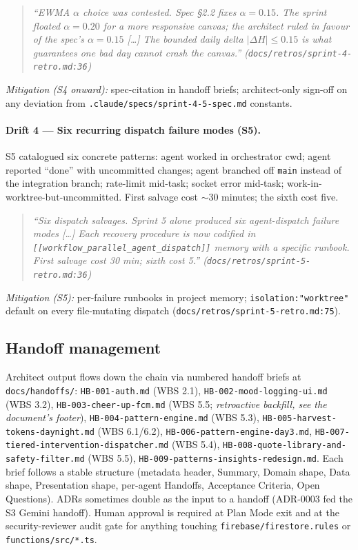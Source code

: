 \documentclass[11pt,a4paper]{article}
\begin{document}
\begin{quote}\itshape
``EWMA $\alpha$ choice was contested. Spec \S 2.2 fixes $\alpha=0.15$.
The sprint floated $\alpha=0.20$ for a more responsive canvas; the
architect ruled in favour of the spec's $\alpha=0.15$ [\ldots] The
bounded daily delta $|\Delta H| \le 0.15$ is what guarantees one bad
day cannot crash the canvas.''
(\texttt{docs/retros/sprint-4-retro.md:36})
\end{quote}

\textit{Mitigation (S4 onward):} spec-citation in handoff briefs;
architect-only sign-off on any deviation from
\texttt{.claude/specs/sprint-4-5-spec.md} constants.

\paragraph{Drift 4 --- Six recurring dispatch failure modes (S5).} S5
catalogued six concrete patterns: agent worked in orchestrator cwd;
agent reported ``done'' with uncommitted changes; agent branched off
\texttt{main} instead of the integration branch; rate-limit mid-task;
socket error mid-task; work-in-worktree-but-uncommitted. First salvage
cost $\sim$30 minutes; the sixth cost five.

\begin{quote}\itshape
``Six dispatch salvages. Sprint 5 alone produced six agent-dispatch
failure modes [\ldots] Each recovery procedure is now codified in
\texttt{[[workflow\_parallel\_agent\_dispatch]]} memory with a specific
runbook. First salvage cost 30 min; sixth cost 5.''
(\texttt{docs/retros/sprint-5-retro.md:36})
\end{quote}

\textit{Mitigation (S5):} per-failure runbooks in project memory;
\texttt{isolation:"worktree"} default on every file-mutating dispatch
(\texttt{docs/retros/sprint-5-retro.md:75}).

\subsection{Handoff management}

Architect output flows down the chain via numbered handoff briefs at
\texttt{docs/handoffs/}: \texttt{HB-001-auth.md} (WBS 2.1),
\texttt{HB-002-mood-logging-ui.md} (WBS 3.2),
\texttt{HB-003-cheer-up-fcm.md} (WBS 5.5; \emph{retroactive backfill, see
the document's footer}), \texttt{HB-004-pattern-engine.md} (WBS 5.3),
\texttt{HB-005-harvest-tokens-daynight.md} (WBS 6.1/6.2),
\texttt{HB-006-pattern-engine-day3.md},
\texttt{HB-007-tiered-intervention-dispatcher.md} (WBS 5.4),
\texttt{HB-008-quote-library-and-safety-filter.md} (WBS 5.5),
\texttt{HB-009-patterns-insights-redesign.md}. Each brief follows a stable structure
(metadata header, Summary, Domain shape, Data shape, Presentation shape,
per-agent Handoffs, Acceptance Criteria, Open Questions). ADRs sometimes
double as the input to a handoff (ADR-0003 fed the S3 Gemini handoff).
Human approval is required at Plan Mode exit and at the security-reviewer
audit gate for anything touching \texttt{firebase/firestore.rules} or
\texttt{functions/src/*.ts}.
\end{document}
